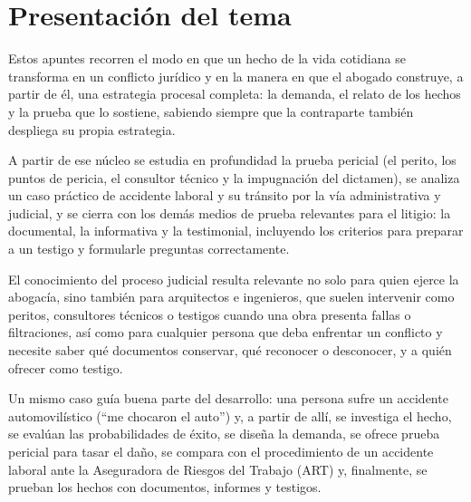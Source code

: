 \documentclass[12pt,oneside]{book}
\begin{document}
\tableofcontents

\chapter*{Presentación del tema}

Estos apuntes recorren el modo en que un hecho de la vida cotidiana se transforma en un conflicto jurídico y en la manera en que el abogado construye, a partir de él, una estrategia procesal completa: la demanda, el relato de los hechos y la prueba que lo sostiene, sabiendo siempre que la contraparte también despliega su propia estrategia.

A partir de ese núcleo se estudia en profundidad la prueba pericial (el perito, los puntos de pericia, el consultor técnico y la impugnación del dictamen), se analiza un caso práctico de accidente laboral y su tránsito por la vía administrativa y judicial, y se cierra con los demás medios de prueba relevantes para el litigio: la documental, la informativa y la testimonial, incluyendo los criterios para preparar a un testigo y formularle preguntas correctamente.

\begin{note}
El conocimiento del proceso judicial resulta relevante no solo para quien ejerce la abogacía, sino también para arquitectos e ingenieros, que suelen intervenir como peritos, consultores técnicos o testigos cuando una obra presenta fallas o filtraciones, así como para cualquier persona que deba enfrentar un conflicto y necesite saber qué documentos conservar, qué reconocer o desconocer, y a quién ofrecer como testigo.
\end{note}

Un mismo caso guía buena parte del desarrollo: una persona sufre un accidente automovilístico (``me chocaron el auto'') y, a partir de allí, se investiga el hecho, se evalúan las probabilidades de éxito, se diseña la demanda, se ofrece prueba pericial para tasar el daño, se compara con el procedimiento de un accidente laboral ante la Aseguradora de Riesgos del Trabajo (ART) y, finalmente, se prueban los hechos con documentos, informes y testigos.
\end{document}
